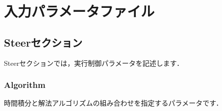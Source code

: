 \pagebreak
\section{入力パラメータファイル}

%
\subsection{Steerセクション}

Steerセクションでは，実行制御パラメータを記述します．\\

%
\subsubsection{Algorithm}

時間積分と\hypertarget{tgt:algorithm}{解法アルゴリズム}の組み合わせを指定するパラメータです．

